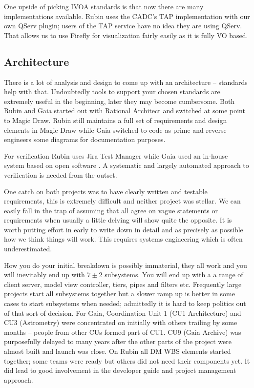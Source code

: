 \documentclass[11pt,twoside]{article}
\begin{document}
One upside of picking IVOA standards is that now there are many implementations available.
Rubin uses the CADC's TAP implementation  with our own QServ plugin; users of the TAP service have no idea they are using QServ.
That allows us to use Firefly for visualization fairly easily as it is
fully VO based.

\subsection{Architecture}
There is a lot of analysis and design to come up with an architecture -- standards help with that.
Undoubtedly tools to support your chosen standards are extremely useful in the beginning, later they may become cumbersome. Both Rubin and Gaia started out with Rational Architect and switched at some point to Magic Draw.
Rubin still maintains a full set of requirements and design elements in Magic Draw while Gaia switched to code as prime and reverse engineers some diagrams for documentation purposes.

For verification  Rubin uses  Jira Test Manager \citep{2018SPIE10705E..0US}  while  Gaia  used an in-house system based on open software \citep{2012SPIE.8449E..0GC}.
A systematic and largely automated approach to verification is needed from the outset.

One catch on both projects was to have clearly written and testable requirements, this is extremely difficult and neither project was stellar.
We can easily fall in the trap of assuming that all agree on vague statements or requirements when usually a little delving will show quite the opposite.
It is worth putting effort in early to write down in detail and as precisely as possible how we think things will work.
This requires systems engineering which is often underestimated.


How you do your initial breakdown is possibly immaterial, they all work and you will inevitably end up with $7 \pm 2$ subsystems.
You will end up with a a range of client server, model view controller, tiers, pipes and filters etc.
Frequently large projects start all subsystems together but
a slower ramp up is better in some cases to start subsystems when needed; admittedly it is  hard to keep politics out of that sort of decision.
For Gaia, Coordination Unit 1 (CU1 Architecture) and CU3 (Astrometry) were concentrated on initially with others trailing by some months -- people from other CUs formed part of CU1.
CU9 (Gaia Archive) was purposefully delayed to many years after the other parts of the project were almost built and launch was close.
On Rubin all DM WBS elements started together;
some  teams were ready but others did not need their components  yet.
It did lead to good involvement in the developer guide and project management approach.
\end{document}
